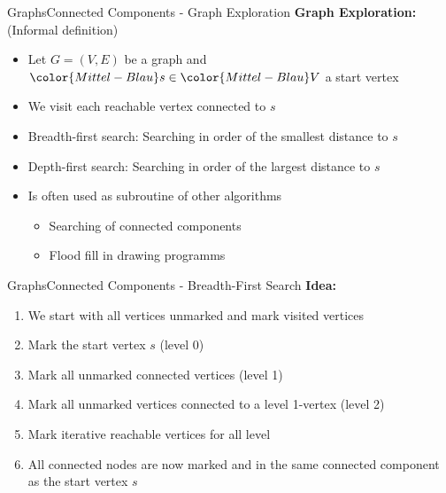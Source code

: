 
\begin{frame}{Graphs}{Connected Components - Graph Exploration}
  \textbf{Graph Exploration:} (Informal definition)
  \begin{itemize}
    \item
      Let {\color{Mittel-Blau}$G = (V , E)$} be a graph and
      ${\color{Mittel-Blau}s} \in {\color{Mittel-Blau}V}$ a start vertex
    \item
      We visit each reachable vertex connected to {\color{Mittel-Blau}$s$}
    \item
      {\color{Mittel-Blau}Breadth-first search}: Searching in order of the
      smallest distance to {\color{Mittel-Blau}$s$}
    \item
      {\color{Mittel-Blau}Depth-first search}: Searching in order of the
      largest distance to {\color{Mittel-Blau}$s$}
    \item
      Is often used as subroutine of other algorithms
      \begin{itemize}
        \item
          Searching of connected components
        \item
          Flood fill in drawing programms
      \end{itemize}
  \end{itemize}
\end{frame}


\begin{frame}{Graphs}{Connected Components - Breadth-First Search}
  \textbf{Idea:}
  \begin{enumerate}
    \item
      We start with all vertices unmarked and
      {\color{Mittel-Blau}mark visited vertices}
    \item
      Mark the start vertex {\color{Mittel-Blau}$s$}
      ({\color{Mittel-Blau}level 0})
    \item
      Mark all unmarked {\color{Mittel-Blau}connected vertices}
      ({\color{Mittel-Blau}level 1})
    \item
      Mark all unmarked {\color{Mittel-Blau}vertices connected} to a
      {\color{Mittel-Blau}level 1}-vertex
      ({\color{Mittel-Blau}level 2})
    \item
      Mark iterative reachable vertices for all level
    \item
      All connected nodes are now marked and in the same
      {\color{Mittel-Blau}connected component} as the start vertex
      {\color{Mittel-Blau}$s$}
  \end{enumerate}
\end{frame}

